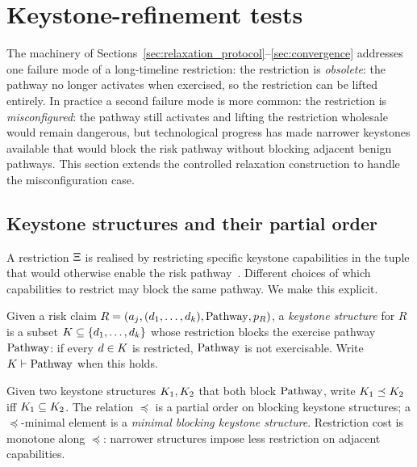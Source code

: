 \section{Keystone-refinement tests}
\label{sec:keystone_refinement}

The machinery of
Sections~\ref{sec:relaxation_protocol}--\ref{sec:convergence}
addresses one failure mode of a long-timeline restriction: the
restriction is \emph{obsolete}: the pathway no longer activates when
exercised, so the restriction can be lifted entirely.  In practice a
second failure mode is more common: the restriction is
\emph{misconfigured}: the pathway still activates and lifting the
restriction wholesale would remain dangerous, but technological
progress has made narrower keystones available that would block the
risk pathway without blocking adjacent benign pathways.  This section
extends the controlled relaxation construction to handle the
misconfiguration case.

\subsection{Keystone structures and their partial order}

A restriction $\Xi$ is realised by restricting specific
keystone capabilities in the tuple that would otherwise enable the
risk pathway~\citep[Proposition~1]{lasser2026horizon}.  Different
choices of which capabilities to restrict may block the same
pathway.  We make this explicit.

\begin{definition}
\label{def:keystone_structure}
Given a risk claim
$R = (a_j, (d_1, \ldots, d_k), \mathrm{Pathway}, p_R)$, a
\emph{keystone structure} for $R$ is a subset
$K \subseteq \{d_1, \ldots, d_k\}$ whose restriction
blocks the exercise pathway $\mathrm{Pathway}$: if every $d \in
K$ is restricted, $\mathrm{Pathway}$ is not exercisable.  Write
$K \vdash \mathrm{Pathway}$ when this holds.
\end{definition}

\begin{definition}
\label{def:keystone_order}
Given two keystone structures $K_1, K_2$
that both block $\mathrm{Pathway}$, write
$K_1 \preceq K_2$ iff
$K_1 \subseteq K_2$.  The relation
$\preceq$ is a partial order on blocking keystone structures; a
$\preceq$-minimal element is a \emph{minimal blocking keystone
structure}.  Restriction cost is monotone along $\preceq$: narrower
structures impose less restriction on adjacent capabilities.
\end{definition}

